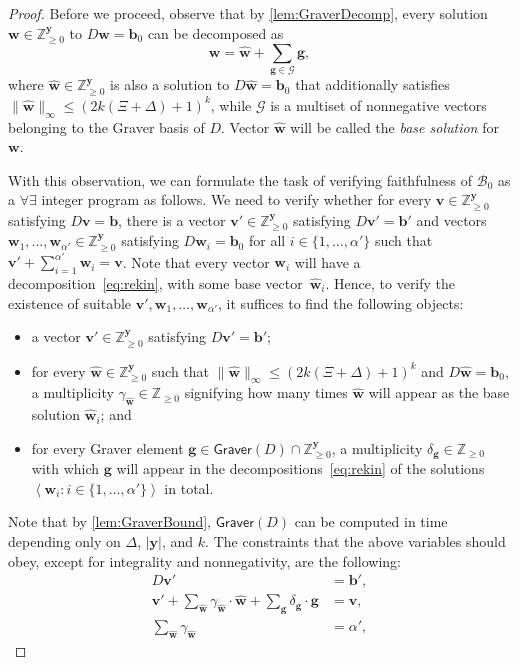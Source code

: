 \documentclass{theoretics}
\renewcommand{\leq}{\leqslant}
\renewcommand{\geq}{\geqslant}
\newcommand{\Bb}{\mathcal{B}}
\newcommand{\Z}{\mathbb{Z}}
\newcommand{\Zn}{\Z_{\geq 0}}
\newcommand{\tup}[1]{{\mathbf{#1}}}
\newcommand{\ww}{\tup w}
\newcommand{\whww}{{\widehat{\ww}}}
\newcommand{\yy}{\tup y}
\newcommand{\bb}{\tup b}
\renewcommand{\gg}{\tup g}
\newcommand{\myvv}{\tup v} %
\newcommand{\Graver}{\mathsf{Graver}}
\newcommand{\mset}[1]{\left\langle #1\right\rangle}
\newcommand{\Gg}{\mathcal{G}}
\begin{document}
\begin{proof}
Before we proceed, observe that by \cref{lem:GraverDecomp}, every solution $\ww\in \Zn^{\yy}$ to $D\ww=\bb_0$ can be decomposed as
\begin{equation}\label{eq:rekin}
    \ww=\whww+\sum_{\gg\in \Gg} \gg,
\end{equation}
where $\whww\in \Zn^{\yy}$ is also a solution to $D\whww=\bb_0$ that additionally satisfies $\|\whww\|_\infty\leq (2k(\Xi+\Delta)+1)^{k}$, while $\Gg$ is a multiset of nonnegative vectors belonging to the Graver basis of $D$. Vector $\whww$ will be called the {\em{base solution}} for $\ww$.

With this observation, we can formulate the task of verifying faithfulness of $\Bb_0$ as a $\forall\exists$ integer program as follows. We need to verify whether for every $\myvv\in \Zn^\yy$ satisfying $D\myvv=\bb$, there is a vector $\myvv'\in \Zn^\yy$ satisfying $D\myvv'=\bb'$ and vectors $\ww_1,\ldots,\ww_{\alpha'}\in \Zn^\yy$ satisfying $D\ww_i=\bb_0$ for all $i\in \{1,\ldots,\alpha'\}$ such that $\myvv'+\sum_{i=1}^{\alpha'}\ww_i=\myvv$. Note that every vector $\ww_i$ will have a decomposition~\cref{eq:rekin}, with some base vector~$\whww_i$. Hence, to verify the existence of suitable $\myvv',\ww_1,\ldots,\ww_{\alpha'}$, it suffices to find the following objects:
\begin{itemize}[nosep]
 \item a vector $\myvv'\in \Zn^\yy$ satisfying $D\myvv'=\bb'$;
 \item for every $\whww\in \Zn^\yy$ such that $\|\whww\|_\infty\leq (2k(\Xi+\Delta)+1)^{k}$ and $D\whww=\bb_0$, a multiplicity $\gamma_{\whww}\in \Zn$ signifying how many times $\whww$ will appear as the base solution $\whww_i$; and
 \item for every Graver element $\gg\in \Graver(D)\cap \Zn^{\yy}$, a multiplicity $\delta_\gg\in \Zn$ with which $\gg$ will appear in the decompositions~\cref{eq:rekin} of the solutions $\mset{\ww_i\colon i\in \{1,\ldots,\alpha'\}}$ in total.
\end{itemize}
Note that by \cref{lem:GraverBound}, $\Graver(D)$ can be computed in time depending only on $\Delta$, $|\yy|$, and $k$.
The constraints that the above variables should obey, except for integrality and nonnegativity, are the following:
\begin{align*}
    D\myvv' & = \bb', \\
    \myvv' + \sum_{\whww} \gamma_{\whww}\cdot \whww + \sum_{\gg} \delta_\gg\cdot \gg & = \myvv,\\
    \sum_{\whww} \gamma_{\whww} & = \alpha' ,

\end{align*}
\end{proof}
\end{document}
